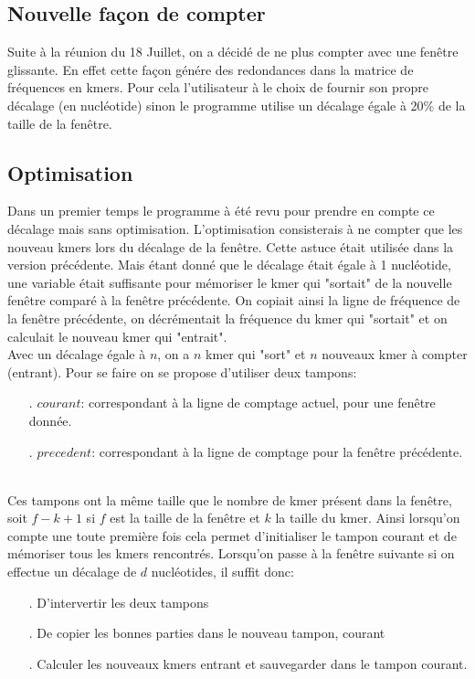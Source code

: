 \subsection{Nouvelle façon de compter}
Suite à la réunion du 18 Juillet, on a décidé de ne plus compter avec une fenêtre glissante. En effet cette façon génére des redondances dans la matrice de fréquences en kmers. Pour 
cela l'utilisateur à le choix de fournir son propre décalage (en nucléotide) sinon le programme utilise un décalage égale à 20\% de la taille de la fenêtre.

\subsection{Optimisation}
Dans un premier temps le programme à été revu pour prendre en compte ce décalage mais sans optimisation. L'optimisation consisterais à ne compter que les nouveau kmers lors du décalage de la fenêtre. Cette astuce était utilisée dans la version précédente. Mais étant donné que le décalage était égale à 1 nucléotide, une variable était suffisante pour mémoriser le kmer qui "sortait" de la nouvelle fenêtre comparé à la fenêtre précédente. On copiait ainsi la ligne de fréquence de la fenêtre précédente, on décrémentait la fréquence du kmer qui "sortait" et on calculait le nouveau kmer qui "entrait".
\\

Avec un décalage égale à $n$, on a $n$ kmer qui "sort" et $n$ nouveaux kmer à compter (entrant). Pour se faire on se propose d'utiliser deux tampons: 
\\
\begin{itemize}
 \item[.] $courant$: correspondant à la ligne de comptage actuel, pour une fenêtre donnée.
 \item[.] $precedent$: correspondant à la ligne de comptage pour la fenêtre précédente.
\end{itemize}
~\\

Ces tampons ont la même taille que le nombre de kmer présent dans la fenêtre, soit $f-k+1$ si $f$ est la taille de la fenêtre et $k$ la taille du kmer. Ainsi lorsqu'on compte une toute première fois cela permet d'initialiser le tampon courant et de mémoriser tous les kmers rencontrés. Lorsqu'on passe à la fenêtre suivante si on effectue un décalage de $d$ nucléotides, il suffit donc:
\\
\begin{itemize}
 \item[.] D'intervertir les deux tampons
 \item[.] De copier les bonnes parties dans le nouveau tampon, courant
 \item[.] Calculer les nouveaux kmers entrant et sauvegarder dans le tampon courant.
\end{itemize}
~\\

